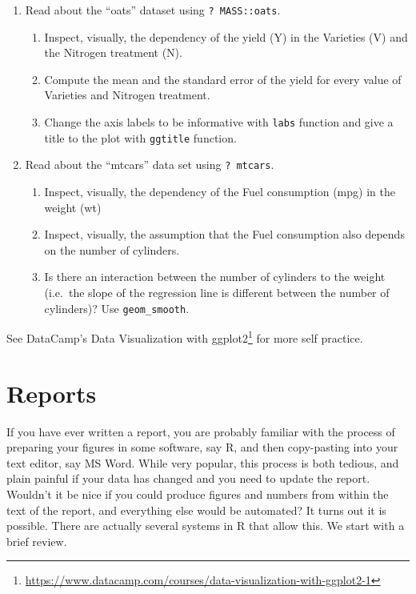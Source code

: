 \documentclass[]{book}
\providecommand{\tightlist}{%
  \setlength{\itemsep}{0pt}\setlength{\parskip}{0pt}}
\renewcommand{\href}[2]{#2\footnote{\url{#1}}}
\theoremstyle{definition}
\theoremstyle{definition}
\theoremstyle{definition}
\theoremstyle{remark}
\begin{document}
\begin{enumerate}
\def\labelenumi{\arabic{enumi}.}
\tightlist
\item
  Read about the ``oats'' dataset using \texttt{?\ MASS::oats}.

  \begin{enumerate}
  \def\labelenumii{\arabic{enumii}.}
  \tightlist
  \item
    Inspect, visually, the dependency of the yield (Y) in the Varieties (V) and the Nitrogen treatment (N).
  \item
    Compute the mean and the standard error of the yield for every value of Varieties and Nitrogen treatment.
  \item
    Change the axis labels to be informative with \texttt{labs} function and give a title to the plot with \texttt{ggtitle} function.
  \end{enumerate}
\item
  Read about the ``mtcars'' data set using \texttt{?\ mtcars}.

  \begin{enumerate}
  \def\labelenumii{\arabic{enumii}.}
  \tightlist
  \item
    Inspect, visually, the dependency of the Fuel consumption (mpg) in the weight (wt)
  \item
    Inspect, visually, the assumption that the Fuel consumption also depends on the number of cylinders.
  \item
    Is there an interaction between the number of cylinders to the weight (i.e.~the slope of the regression line is different between the number of cylinders)? Use \texttt{geom\_smooth}.
  \end{enumerate}
\end{enumerate}

See DataCamp's \href{https://www.datacamp.com/courses/data-visualization-with-ggplot2-1}{Data Visualization with ggplot2} for more self practice.

\hypertarget{report}{%
\chapter{Reports}\label{report}}

If you have ever written a report, you are probably familiar with the process of preparing your figures in some software, say R, and then copy-pasting into your text editor, say MS Word.
While very popular, this process is both tedious, and plain painful if your data has changed and you need to update the report.
Wouldn't it be nice if you could produce figures and numbers from within the text of the report, and everything else would be automated?
It turns out it is possible.
There are actually several systems in R that allow this.
We start with a brief review.
\end{document}
